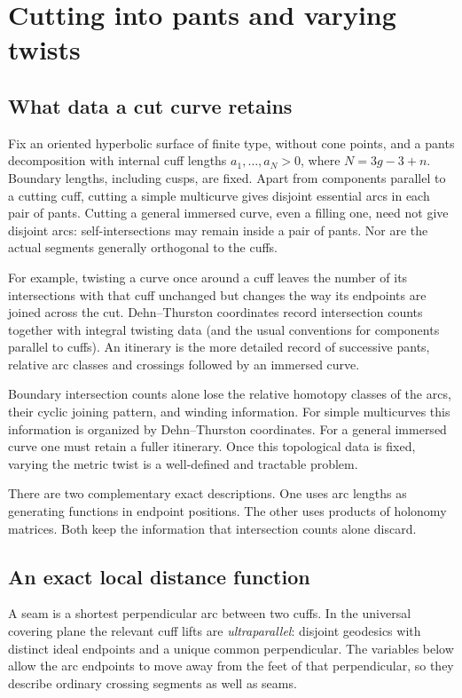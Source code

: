 \section{Cutting into pants and varying twists}
\label{sec:twists}

\subsection{What data a cut curve retains}

Fix an oriented hyperbolic surface of finite type, without cone points,
and a pants decomposition with internal cuff lengths $a_1,\ldots,a_N>0$,
where $N=3g-3+n$. Boundary lengths, including cusps, are fixed.
Apart from components parallel to a cutting cuff, cutting a simple
multicurve gives disjoint essential arcs in each pair of pants.
Cutting a general immersed curve, even a filling one,
need not give disjoint arcs: self-intersections may remain inside a pair
of pants. Nor are the actual segments generally orthogonal to the cuffs.

For example, twisting a curve once around a cuff leaves the number
of its intersections with that cuff unchanged but changes the way
its endpoints are joined across the cut. Dehn--Thurston coordinates
record intersection counts together with integral twisting data
(and the usual conventions for components parallel to cuffs).
An itinerary is the more detailed record of successive pants,
relative arc classes and crossings followed by an immersed curve.

Boundary intersection counts alone lose the relative homotopy classes of
the arcs, their cyclic joining pattern, and winding information. For simple
multicurves this information is organized by Dehn--Thurston coordinates.
For a general immersed curve one must retain a fuller itinerary. Once this
topological data is fixed, varying the metric twist is a well-defined and
tractable problem.

There are two complementary exact descriptions. One uses arc lengths as
generating functions in endpoint positions. The other uses products of
holonomy matrices. Both keep the information that intersection counts alone
discard.

\subsection{An exact local distance function}

A seam is a shortest perpendicular arc between two cuffs.
In the universal covering plane the relevant cuff lifts are
\emph{ultraparallel}: disjoint geodesics with distinct ideal
endpoints and a unique common perpendicular. The variables below
allow the arc endpoints to move away from the feet of that
perpendicular, so they describe ordinary crossing segments as
well as seams.

